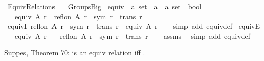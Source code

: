 %
\begin{isabellebody}%
%
%
\isadelimdocument
%
\endisadelimdocument
%
\isatagdocument
%
\isamarkuptrue%
%
\endisatagdocument
{\isafolddocument}%
%
\isadelimdocument
%
\endisadelimdocument
%
\isadelimtheory
%
\endisadelimtheory
%
\isatagtheory
{}\isamarkupfalse%
\ Equiv{\isacharunderscore}{\kern0pt}Relations\isanewline
\ \ \ Groups{\isacharunderscore}{\kern0pt}Big\isanewline
{}%
\endisatagtheory
{\isafoldtheory}%
%
\isadelimtheory
%
\endisadelimtheory
%
\isadelimdocument
%
\endisadelimdocument
%
\isatagdocument
%
\isamarkuptrue%
%
\endisatagdocument
{\isafolddocument}%
%
\isadelimdocument
%
\endisadelimdocument
{}\isamarkupfalse%
\ equiv\ {\isacharcolon}{\kern0pt}{\isacharcolon}{\kern0pt}\ {\isachardoublequoteopen}{\isacharprime}{\kern0pt}a\ set\ {\isasymRightarrow}\ {\isacharparenleft}{\kern0pt}{\isacharprime}{\kern0pt}a\ {\isasymtimes}\ {\isacharprime}{\kern0pt}a{\isacharparenright}{\kern0pt}\ set\ {\isasymRightarrow}\ bool{\isachardoublequoteclose}\isanewline
\ \ \ {\isachardoublequoteopen}equiv\ A\ r\ {\isasymlongleftrightarrow}\ refl{\isacharunderscore}{\kern0pt}on\ A\ r\ {\isasymand}\ sym\ r\ {\isasymand}\ trans\ r{\isachardoublequoteclose}\isanewline
\isanewline
{}\isamarkupfalse%
\ equivI{\isacharcolon}{\kern0pt}\ {\isachardoublequoteopen}refl{\isacharunderscore}{\kern0pt}on\ A\ r\ {\isasymLongrightarrow}\ sym\ r\ {\isasymLongrightarrow}\ trans\ r\ {\isasymLongrightarrow}\ equiv\ A\ r{\isachardoublequoteclose}\isanewline
%
\isadelimproof
\ \ %
\endisadelimproof
%
\isatagproof
{}\isamarkupfalse%
\ {\isacharparenleft}{\kern0pt}simp\ add{\isacharcolon}{\kern0pt}\ equiv{\isacharunderscore}{\kern0pt}def{\isacharparenright}{\kern0pt}%
\endisatagproof
{\isafoldproof}%
%
\isadelimproof
\isanewline
%
\endisadelimproof
\isanewline
{}\isamarkupfalse%
\ equivE{\isacharcolon}{\kern0pt}\isanewline
\ \ \ {\isachardoublequoteopen}equiv\ A\ r{\isachardoublequoteclose}\isanewline
\ \ \ {\isachardoublequoteopen}refl{\isacharunderscore}{\kern0pt}on\ A\ r{\isachardoublequoteclose}\ \ {\isachardoublequoteopen}sym\ r{\isachardoublequoteclose}\ \ {\isachardoublequoteopen}trans\ r{\isachardoublequoteclose}\isanewline
%
\isadelimproof
\ \ %
\endisadelimproof
%
\isatagproof
{}\isamarkupfalse%
\ assms\ \isamarkupfalse%
\ {\isacharparenleft}{\kern0pt}simp\ add{\isacharcolon}{\kern0pt}\ equiv{\isacharunderscore}{\kern0pt}def{\isacharparenright}{\kern0pt}%
\endisatagproof
{\isafoldproof}%
%
\isadelimproof
%
\endisadelimproof
%
\begin{isamarkuptext}%
Suppes, Theorem 70:  is an equiv relation iff .


\end{isamarkuptext}
\end{isabellebody}
